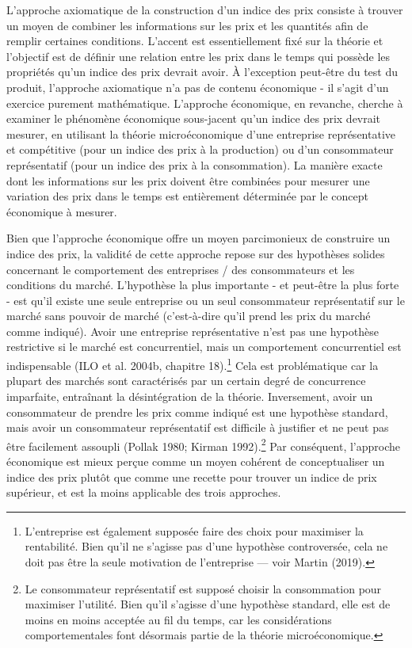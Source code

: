 \documentclass[
]{article}
\begin{document}
L'approche axiomatique de la construction d'un indice des prix consiste à trouver un moyen de combiner les informations sur les prix et les quantités afin de remplir certaines conditions. L'accent est essentiellement fixé sur la théorie et l'objectif est de définir une relation entre les prix dans le temps qui possède les propriétés qu'un indice des prix devrait avoir. À l'exception peut-être du test du produit, l'approche axiomatique n'a pas de contenu économique - il s'agit d'un exercice purement mathématique. L'approche économique, en revanche, cherche à examiner le phénomène économique sous-jacent qu'un indice des prix devrait mesurer, en utilisant la théorie microéconomique d'une entreprise représentative et compétitive (pour un indice des prix à la production) ou d'un consommateur représentatif (pour un indice des prix à la consommation). La manière exacte dont les informations sur les prix doivent être combinées pour mesurer une variation des prix dans le temps est entièrement déterminée par le concept économique à mesurer.

Bien que l'approche économique offre un moyen parcimonieux de construire un indice des prix, la validité de cette approche repose sur des hypothèses solides concernant le comportement des entreprises / des consommateurs et les conditions du marché. L'hypothèse la plus importante - et peut-être la plus forte - est qu'il existe une seule entreprise ou un seul consommateur représentatif sur le marché sans pouvoir de marché (c'est-à-dire qu'il prend les prix du marché comme indiqué). Avoir une entreprise représentative n'est pas une hypothèse restrictive si le marché est concurrentiel, mais un comportement concurrentiel est indispensable (ILO et al. 2004b, chapitre 18).\footnote{L'entreprise est également supposée faire des choix pour maximiser la rentabilité. Bien qu'il ne s'agisse pas d'une hypothèse controversée, cela ne doit pas être la seule motivation de l'entreprise --- voir Martin (2019).} Cela est problématique car la plupart des marchés sont caractérisés par un certain degré de concurrence imparfaite, entraînant la désintégration de la théorie. Inversement, avoir un consommateur de prendre les prix comme indiqué est une hypothèse standard, mais avoir un consommateur représentatif est difficile à justifier et ne peut pas être facilement assoupli (Pollak 1980; Kirman 1992).\footnote{Le consommateur représentatif est supposé choisir la consommation pour maximiser l'utilité. Bien qu'il s'agisse d'une hypothèse standard, elle est de moins en moins acceptée au fil du temps, car les considérations comportementales font désormais partie de la théorie microéconomique.} Par conséquent, l'approche économique est mieux perçue comme un moyen cohérent de conceptualiser un indice des prix plutôt que comme une recette pour trouver un indice de prix supérieur, et est la moins applicable des trois approches.
\end{document}
